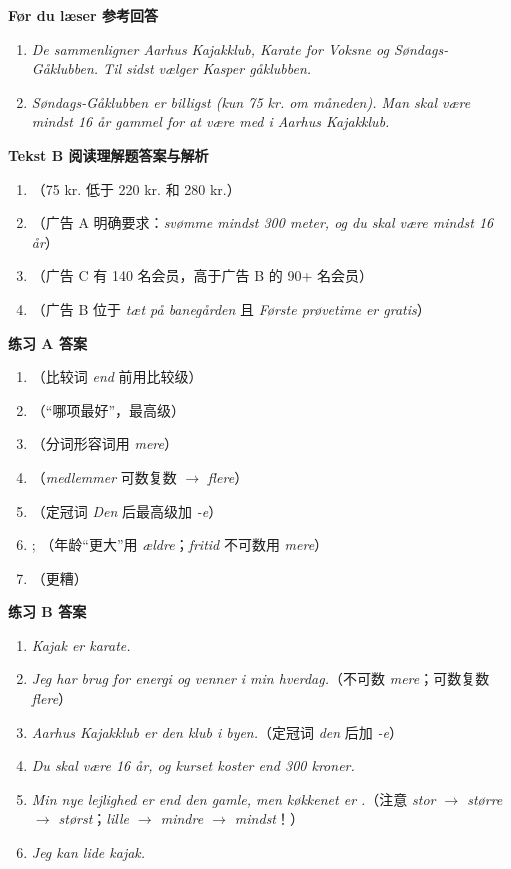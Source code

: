 \begin{answerbox}
\textbf{Før du læser 参考回答}
\begin{enumerate}
  \item \textit{De sammenligner Aarhus Kajakklub, Karate for Voksne og Søndags-Gåklubben. Til sidst vælger Kasper gåklubben.}
  \item \textit{Søndags-Gåklubben er billigst (kun 75 kr. om måneden). Man skal være mindst 16 år gammel for at være med i Aarhus Kajakklub.}
\end{enumerate}

\textbf{Tekst B 阅读理解题答案与解析}
\begin{enumerate}
  \item {}（75 kr. 低于 220 kr. 和 280 kr.）
  \item {}（广告 A 明确要求：\textit{svømme mindst 300 meter, og du skal være mindst 16 år}）
  \item {}（广告 C 有 140 名会员，高于广告 B 的 90+ 名会员）
  \item {}（广告 B 位于 \textit{tæt på banegården} 且 \textit{Første prøvetime er gratis}）
\end{enumerate}

\textbf{练习 A 答案}
\begin{enumerate}
  \item {}（比较词 \textit{end} 前用比较级）
  \item {}（“哪项最好”，最高级）
  \item {}（分词形容词用 \textit{mere}）
  \item {}（\textit{medlemmer} 可数复数 $\rightarrow$ \textit{flere}）
  \item {}（定冠词 \textit{Den} 后最高级加 \textit{-e}）
  \item {}; （年龄“更大”用 \textit{ældre}；\textit{fritid} 不可数用 \textit{mere}）
  \item {}（更糟）
\end{enumerate}

\textbf{练习 B 答案}
\begin{enumerate}
  \item \textit{Kajak er  karate.}
  \item \textit{Jeg har brug for  energi og  venner i min hverdag.}（不可数 \textit{mere}；可数复数 \textit{flere}）
  \item \textit{Aarhus Kajakklub er den  klub i byen.}（定冠词 \textit{den} 后加 \textit{-e}）
  \item \textit{Du skal være  16 år, og kurset koster  end 300 kroner.}
  \item \textit{Min nye lejlighed er  end den gamle, men køkkenet er .}（注意 \textit{stor $\rightarrow$ større $\rightarrow$ størst}；\textit{lille $\rightarrow$ mindre $\rightarrow$ mindst}！）
  \item \textit{Jeg kan  lide kajak.}
\end{enumerate}


\end{answerbox}
